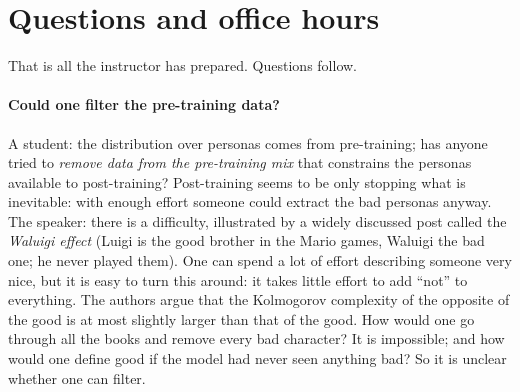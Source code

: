 
\section{Questions and office hours}\label{sec:L7-questions}
That is all the instructor has prepared. Questions follow.

\paragraph{Could one filter the pre-training data?}
A student: the distribution over personas comes from pre-training; has anyone tried to \emph{remove data from the pre-training mix} that constrains the personas available to post-training? Post-training seems to be only stopping what is inevitable: with enough effort someone could extract the bad personas anyway. The speaker: there is a difficulty, illustrated by a widely discussed post called the \emph{Waluigi effect} (Luigi is the good brother in the Mario games, Waluigi the bad one; he never played them). One can spend a lot of effort describing someone very nice, but it is easy to turn this around: it takes little effort to add ``not'' to everything. The authors argue that the Kolmogorov complexity of the opposite of the good is at most slightly larger than that of the good. How would one go through all the books and remove every bad character? It is impossible; and how would one define good if the model had never seen anything bad? So it is unclear whether one can filter.


